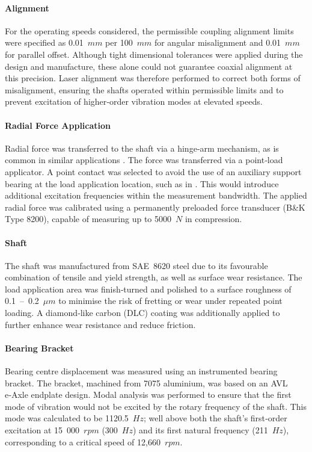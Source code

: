 \paragraph{Alignment}
For the operating speeds considered, the permissible coupling alignment limits were specified as 0.01~$mm$ per 100~$mm$ for angular misalignment and 0.01~$mm$ for parallel offset. Although tight dimensional tolerances were applied during the design and manufacture, these alone could not guarantee coaxial alignment at this precision. Laser alignment was therefore performed to correct both forms of misalignment, ensuring the shafts operated within permissible limits and to prevent excitation of higher‑order vibration modes at elevated speeds.

\paragraph{Radial Force Application}
Radial force was transferred to the shaft via a hinge‑arm mechanism, as is common in similar applications \cite{Cockburn1995a}. The force was transferred via a point‑load applicator. A point contact was selected to avoid the use of an auxiliary support bearing at the load application location, such as in \cite{Flack1993a}. This would introduce additional excitation frequencies within the measurement bandwidth. The applied radial force was calibrated using a permanently preloaded force transducer (B\&K Type 8200), capable of measuring up to 5000~$N$ in compression.

\paragraph{Shaft}
The shaft was manufactured from SAE~8620 steel due to its favourable combination of tensile and yield strength, as well as surface wear resistance. The load application area was finish‑turned and polished to a surface roughness of 0.1~–~0.2~$\mu m$ to minimise the risk of fretting or wear under repeated point loading. A diamond‑like carbon (DLC) coating was additionally applied to further enhance wear resistance and reduce friction.

\paragraph{Bearing Bracket}
Bearing centre displacement was measured using an instrumented bearing bracket. The bracket, machined from 7075 aluminium, was based on an AVL e‑Axle endplate design. Modal analysis was performed to ensure that the first mode of vibration would not be excited by the rotary frequency of the shaft. This mode was calculated to be 1120.5~$Hz$; well above both the shaft’s first‑order excitation at 15~000~$rpm$ (300~$Hz$) and its first natural frequency (211~$Hz$), corresponding to a critical speed of 12,660~$rpm$.

